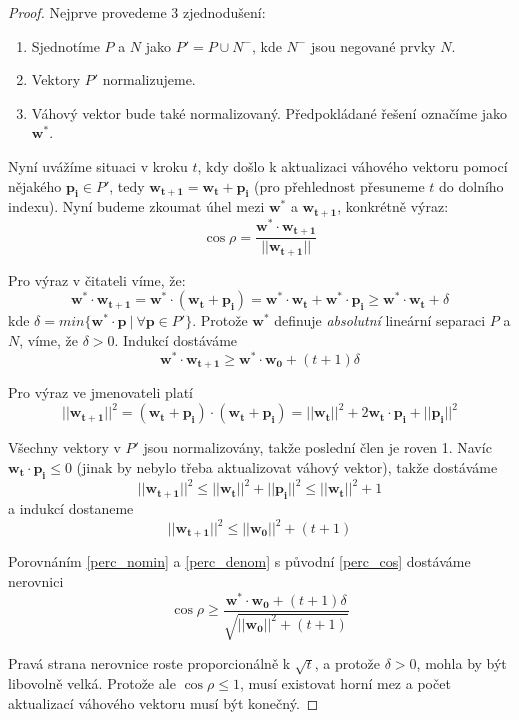\documentclass[11pt]{report} %
\renewcommand{\vec}[1]{\mathbf{#1}}
\begin{document}
\begin{proof}
Nejprve provedeme 3 zjednodušení:
\begin{enumerate}
	\leftskip 40pt
	\setlength{\itemsep}{0pt}
	\item Sjednotíme $P$ a $N$ jako $P' = P \cup N^-$, kde $N^-$ jsou negované prvky $N$.
	\item Vektory $P'$ normalizujeme.
	\item Váhový vektor bude také normalizovaný. Předpokládané řešení označíme jako $\vec{w^*}$.
\end{enumerate}

Nyní uvážíme situaci v kroku $t$, kdy došlo k aktualizaci váhového vektoru pomocí nějakého $\vec{p_i} \in P'$, tedy $\vec{w_{t+1}} = \vec{w_t} + \vec{p_i}$ (pro přehlednost přesuneme $t$ do dolního indexu). Nyní budeme zkoumat úhel mezi $\vec{w^*}$ a $\vec{w_{t+1}}$, konkrétně výraz:
\begin{equation}
\label{perc_cos}
\cos{\rho} = \frac{\vec{w^*} \cdot \vec{w_{t+1}}}{||\vec{w_{t+1}}||}
\end{equation}

Pro výraz v čitateli víme, že:
$$\vec{w^*}\cdot\vec{w_{t+1}} = \vec{w^*}\cdot(\vec{w_{t}} + \vec{p_i}) = \vec{w^*}\cdot\vec{w_{t}} + \vec{w^*}\cdot\vec{p_i} \geq \vec{w^*}\cdot\vec{w_{t}} + \delta$$ 
kde $\delta = min\{\vec{w^*}\cdot\vec{p}\ |\ \forall\vec{p} \in P'\}$. Protože $\vec{w^*}$ definuje \textit{absolutní} lineární separaci $P$ a $N$, víme, že $\delta > 0$. Indukcí dostáváme
\begin{equation}
	\label{perc_nomin}
	\vec{w^*}\cdot\vec{w_{t+1}} \geq \vec{w^*}\cdot\vec{w_0} + (t+1)\delta
\end{equation}

Pro výraz ve jmenovateli platí
$$||\vec{w_{t+1}}||^2 
= (\vec{w_{t}} + \vec{p_i}) \cdot (\vec{w_{t}} + \vec{p_i}) 
= ||\vec{w_t}||^2 + 2\vec{w_t}\cdot\vec{p_i} + ||\vec{p_i}||^2
$$

Všechny vektory v $P'$ jsou normalizovány, takže poslední člen je roven 1. Navíc $\vec{w_t}\cdot\vec{p_i} \leq 0$ (jinak by nebylo třeba aktualizovat váhový vektor), takže dostáváme
$$
||\vec{w_{t+1}}||^2 \leq ||\vec{w_t}||^2 + ||\vec{p_i}||^2 \leq ||\vec{w_t}||^2 + 1
$$
a indukcí dostaneme
\begin{equation}
\label{perc_denom}
||\vec{w_{t+1}}||^2 \leq ||\vec{w_0}||^2 + (t+1)
\end{equation}

Porovnáním \ref{perc_nomin} a \ref{perc_denom} s původní \ref{perc_cos} dostáváme nerovnici
$$
\cos\rho \geq \frac{\vec{w^*}\cdot\vec{w_0} + (t+1)\delta}{\sqrt{||\vec{w_0}||^2 + (t+1)}}
$$

Pravá strana nerovnice roste proporcionálně k $\sqrt{t}$, a protože $\delta > 0$, mohla by být libovolně velká. Protože ale $\cos\rho \leq 1$, musí existovat horní mez a počet aktualizací váhového vektoru musí být konečný.

\end{proof}
\end{document}
